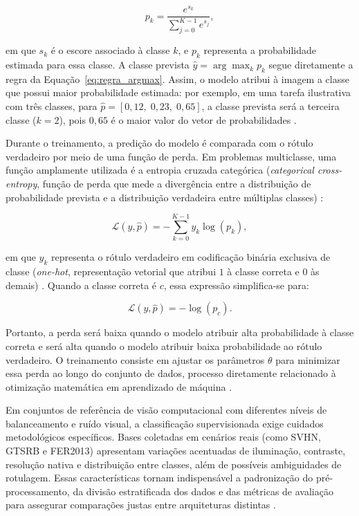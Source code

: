 \documentclass[
    12pt,
    openright,
    oneside,
    a4paper,
    english,
    brazil
]{abntex2}
\begin{document}
\begin{equation}
\label{eq:softmax}
p_k =
\frac{e^{s_k}}
{\sum_{j=0}^{K-1} e^{s_j}},
\end{equation}

em que \(s_k\) é o escore associado à classe \(k\), e \(p_k\) representa a probabilidade estimada para essa classe. A classe prevista \(\hat{y} = \arg\max_k p_k\) segue diretamente a regra da Equação~\eqref{eq:regra_argmax}. Assim, o modelo atribui à imagem a classe que possui maior probabilidade estimada: por exemplo, em uma tarefa ilustrativa com três classes, para \(\hat{p} = [0{,}12,\; 0{,}23,\; 0{,}65]\), a classe prevista será a terceira classe (\(k=2\)), pois \(0{,}65\) é o maior valor do vetor de probabilidades \cite{goodfellow2016deep,deisenroth2020mathematics}.

Durante o treinamento, a predição do modelo é comparada com o rótulo verdadeiro por meio de uma função de perda. Em problemas multiclasse, uma função amplamente utilizada é a entropia cruzada categórica (\textit{categorical cross-entropy}, função de perda que mede a divergência entre a distribuição de probabilidade prevista e a distribuição verdadeira entre múltiplas classes) \cite{goodfellow2016deep}:

\begin{equation}
\label{eq:entropia_cruzada}
\mathcal{L}(y,\hat{p}) =
-\sum_{k=0}^{K-1}
y_k \log(p_k),
\end{equation}

em que \(y_k\) representa o rótulo verdadeiro em codificação binária exclusiva de classe (\textit{one-hot}, representação vetorial que atribui \(1\) à classe correta e \(0\) às demais) \cite{goodfellow2016deep}. Quando a classe correta é \(c\), essa expressão simplifica-se para:

\begin{equation}
\label{eq:entropia_cruzada_onehot}
\mathcal{L}(y,\hat{p}) =
-\log(p_c).
\end{equation}

Portanto, a perda será baixa quando o modelo atribuir alta probabilidade à classe correta e será alta quando o modelo atribuir baixa probabilidade ao rótulo verdadeiro. O treinamento consiste em ajustar os parâmetros \(\theta\) para minimizar essa perda ao longo do conjunto de dados, processo diretamente relacionado à otimização matemática em aprendizado de máquina \cite{deisenroth2020mathematics,goodfellow2016deep}.

Em conjuntos de referência de visão computacional com diferentes níveis de balanceamento e ruído visual, a classificação supervisionada exige cuidados metodológicos específicos. Bases coletadas em cenários reais (como SVHN, GTSRB e FER2013) apresentam variações acentuadas de iluminação, contraste, resolução nativa e distribuição entre classes, além de possíveis ambiguidades de rotulagem. Essas características tornam indispensável a padronização do pré-processamento, da divisão estratificada dos dados e das métricas de avaliação para assegurar comparações justas entre arquiteturas distintas \cite{netzer2011svhn,stallkamp2012gtsrb,goodfellow2013fer2013,Wazlawick2020}.
\end{document}
